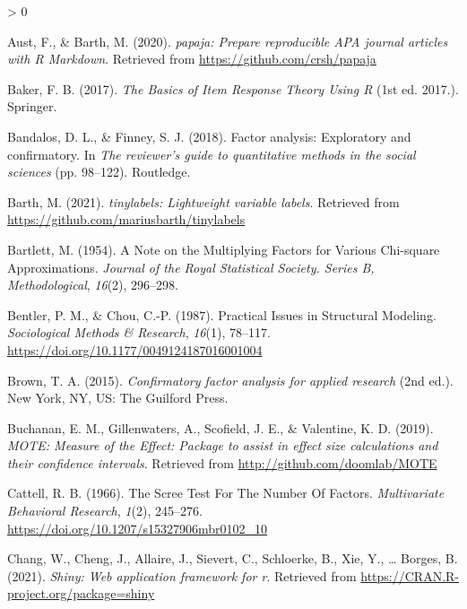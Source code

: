 \documentclass[
  english,
  man]{apa6}
\newlength{\cslhangindent}
\newenvironment{CSLReferences}[2] %
 {%
  \setlength{\parindent}{0pt}
  \ifodd #1 \everypar{\setlength{\hangindent}{\cslhangindent}}\ignorespaces\fi
  \ifnum #2 > 0
  \setlength{\parskip}{#2\baselineskip}
  \fi
 }%
 {}
\begin{document}
\hypertarget{refs}{}
\begin{CSLReferences}{1}{0}
\leavevmode\hypertarget{ref-R-papaja}{}%
Aust, F., \& Barth, M. (2020). \emph{{papaja}: {Prepare} reproducible {APA} journal articles with {R Markdown}}. Retrieved from \url{https://github.com/crsh/papaja}

\leavevmode\hypertarget{ref-bakerBasicsItemResponse2017}{}%
Baker, F. B. (2017). \emph{The {Basics} of {Item Response Theory Using R}} (1st ed. 2017.). {Springer}.

\leavevmode\hypertarget{ref-bandalosFactorAnalysisExploratory2018}{}%
Bandalos, D. L., \& Finney, S. J. (2018). Factor analysis: {Exploratory} and confirmatory. In \emph{The reviewer's guide to quantitative methods in the social sciences} (pp. 98--122). {Routledge}.

\leavevmode\hypertarget{ref-R-tinylabels}{}%
Barth, M. (2021). \emph{{tinylabels}: Lightweight variable labels}. Retrieved from \url{https://github.com/mariusbarth/tinylabels}

\leavevmode\hypertarget{ref-bartlettNoteMultiplyingFactors1954}{}%
Bartlett, M. (1954). A {Note} on the {Multiplying Factors} for {Various Chi}-square {Approximations}. \emph{Journal of the Royal Statistical Society. Series B, Methodological}, \emph{16}(2), 296--298.

\leavevmode\hypertarget{ref-bentlerPracticalIssuesStructural1987}{}%
Bentler, P. M., \& Chou, C.-P. (1987). Practical {Issues} in {Structural Modeling}. \emph{Sociological Methods \& Research}, \emph{16}(1), 78--117. \url{https://doi.org/10.1177/0049124187016001004}

\leavevmode\hypertarget{ref-brownConfirmatoryFactorAnalysis2015}{}%
Brown, T. A. (2015). \emph{Confirmatory factor analysis for applied research} (2nd ed.). {New York, NY, US}: {The Guilford Press}.

\leavevmode\hypertarget{ref-R-MOTE}{}%
Buchanan, E. M., Gillenwaters, A., Scofield, J. E., \& Valentine, K. D. (2019). \emph{{MOTE: Measure of the Effect}: Package to assist in effect size calculations and their confidence intervals}. Retrieved from \url{http://github.com/doomlab/MOTE}

\leavevmode\hypertarget{ref-cattellScreeTestNumber1966}{}%
Cattell, R. B. (1966). The {Scree Test For The Number Of Factors}. \emph{Multivariate Behavioral Research}, \emph{1}(2), 245--276. \url{https://doi.org/10.1207/s15327906mbr0102_10}

\leavevmode\hypertarget{ref-R-shiny}{}%
Chang, W., Cheng, J., Allaire, J., Sievert, C., Schloerke, B., Xie, Y., \ldots{} Borges, B. (2021). \emph{Shiny: Web application framework for r}. Retrieved from \url{https://CRAN.R-project.org/package=shiny}


\end{CSLReferences}
\end{document}
